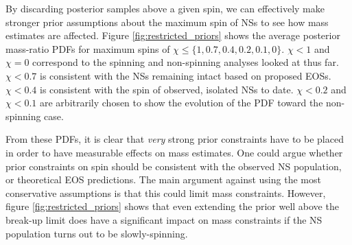 By discarding posterior samples above a given spin, we can effectively make stronger prior assumptions about the maximum spin of NSs to see how mass estimates are affected.  Figure \ref{fig:restricted_priors} shows the average posterior mass-ratio PDFs for maximum spins of $\chi \leq \{1, 0.7, 0.4, 0.2, 0.1, 0\}$.  $\chi<1$ and $\chi=0$ correspond to the spinning and non-spinning analyses looked at thus far.  $\chi<0.7$ is consistent with the NSs remaining intact based on proposed EOSs.  $\chi<0.4$ is consistent with the spin of observed, isolated NSs to date.  $\chi<0.2$ and $\chi<0.1$ are arbitrarily chosen to show the evolution of the PDF toward the non-spinning case.

From these PDFs, it is clear that \emph{very} strong prior constraints have to be placed in order to have measurable effects on mass estimates. One could argue whether prior constraints on spin should be consistent with the observed NS population, or theoretical EOS predictions.  The main argument against using the most conservative assumptions is that this could limit mass constraints.  However, figure \ref{fig:restricted_priors} shows that even extending the prior well above the break-up limit does have a significant impact on mass constraints if the NS population turns out to be slowly-spinning.
  